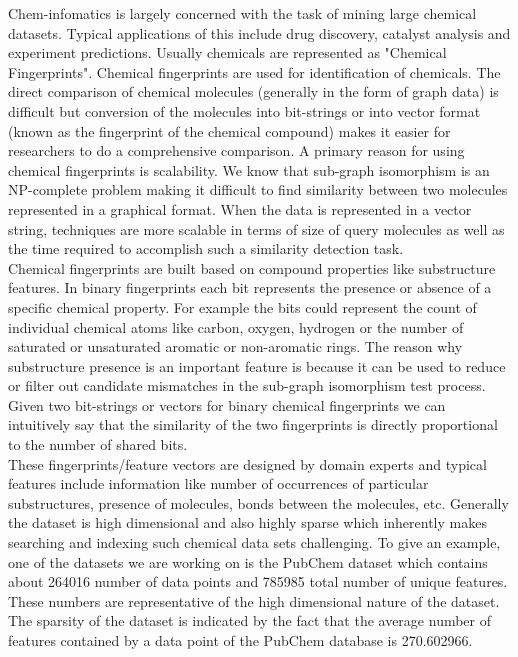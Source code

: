 
%
%

Chem-infomatics is largely concerned with the task of mining large chemical datasets. Typical applications of this include drug discovery, catalyst analysis and experiment predictions. Usually chemicals are represented as "Chemical Fingerprints". Chemical fingerprints are used for identification of chemicals.  The direct comparison of chemical molecules (generally in the form of graph data) is difficult but conversion of the molecules into bit-strings or into vector format (known as the fingerprint of the chemical compound) makes it easier for researchers to do a comprehensive comparison. A primary reason for using chemical fingerprints is scalability. We know that sub-graph isomorphism is an NP-complete problem making it difficult to find similarity between two molecules represented in a graphical format. When the data is represented in a vector string, techniques are more scalable in terms of size of query molecules as well as the time required to accomplish such a similarity detection task.\\

Chemical fingerprints are built based on compound properties like substructure features. In binary fingerprints each bit represents the presence or absence of a specific chemical property. For example the bits could represent the count of individual chemical atoms like carbon, oxygen, hydrogen or the number of saturated or unsaturated aromatic or non-aromatic rings. The reason why substructure presence is an important feature is because it can be used to reduce or filter out candidate mismatches in the sub-graph isomorphism test process. Given two bit-strings or vectors for binary chemical  fingerprints we can intuitively say that the similarity of the two fingerprints is directly proportional to the number of shared bits. \\

These fingerprints/feature vectors are designed by domain experts and typical features include information like number of occurrences of particular substructures, presence of molecules, bonds between the molecules, etc. Generally the dataset is high dimensional and also highly sparse which inherently makes searching and indexing such chemical data sets challenging. To give an example, one of the datasets we are working on is the PubChem dataset which contains about 264016 number of data points and 785985 total number of unique features. These numbers are representative of the high dimensional nature of the dataset. The sparsity of the dataset is indicated by the fact that the average number of features contained by a data point of the PubChem database is 270.602966.
	
